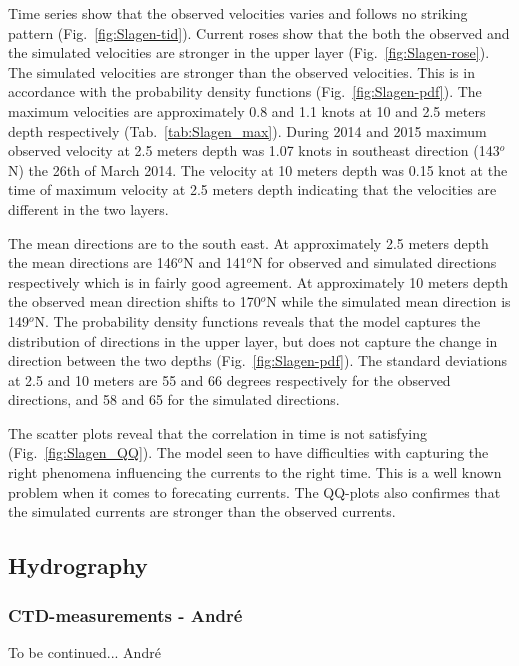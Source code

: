 \documentclass[12pt,a4paper,english]{article}
\begin{document}
Time series show that the observed velocities varies and follows no striking pattern (Fig.~\ref{fig:Slagen-tid}).
Current roses show that the both the observed and the simulated velocities are stronger in the upper layer (Fig.~\ref{fig:Slagen-rose}). The simulated velocities are stronger than the observed velocities. This is in accordance with the probability density functions (Fig.~\ref{fig:Slagen-pdf}). The maximum velocities are approximately 0.8 and 1.1 knots at 10 and 2.5 meters depth respectively (Tab.~\ref{tab:Slagen_max}). During 2014 and 2015 maximum observed velocity at 2.5 meters depth was 1.07 knots in southeast direction (143$^o$N) the 26th of March 2014. The velocity at 10 meters depth was 0.15 knot at the time of maximum velocity at 2.5 meters depth indicating that the velocities are different in the two layers.

The mean directions are to the south east. At approximately 2.5 meters depth the mean directions are 146$^o$N and 141$^o$N for observed and simulated directions respectively which is in fairly good agreement. At approximately 10 meters depth the observed mean direction shifts to 170$^o$N while the simulated mean direction is 149$^o$N. The probability density functions reveals that the model captures the distribution of directions in the upper layer, but does not capture the change in direction between the two depths (Fig.~\ref{fig:Slagen-pdf}). The standard deviations  at 2.5 and 10 meters are 55 and 66 degrees respectively for the observed directions, and 58 and 65 for the simulated directions.

The scatter plots reveal that the correlation in time is not satisfying (Fig.~\ref{fig:Slagen_QQ}). The model seen to have difficulties with capturing the right phenomena influencing the currents to the right time. This is a well known problem when it comes to forecating currents. The QQ-plots also confirmes that the simulated currents are stronger than the observed currents. 


\clearpage
\subsection{Hydrography}

\subsubsection{CTD-measurements - Andr\'{e}}
To be continued... Andr\'{e}

\clearpage 
\end{document}
